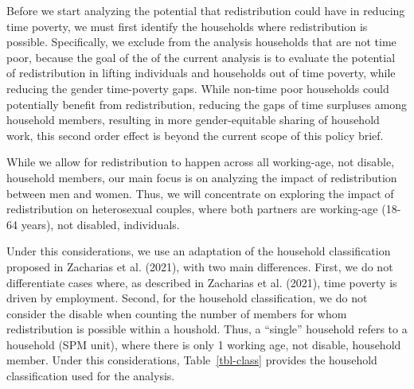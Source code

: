 \documentclass[
  11pt,
]{article}
\begin{document}
Before we start analyzing the potential that redistribution could have
in reducing time poverty, we must first identify the households where
redistribution is possible. Specifically, we exclude from the analysis
households that are not time poor, because the goal of the of the
current analysis is to evaluate the potential of redistribution in
lifting individuals and households out of time poverty, while reducing
the gender time-poverty gaps. While non-time poor households could
potentially benefit from redistribution, reducing the gaps of time
surpluses among household members, resulting in more gender-equitable
sharing of household work, this second order effect is beyond the
current scope of this policy brief.

While we allow for redistribution to happen across all working-age, not
disable, household members, our main focus is on analyzing the impact of
redistribution between men and women. Thus, we will concentrate on
exploring the impact of redistribution on heterosexual couples, where
both partners are working-age (18-64 years), not disabled, individuals.

Under this considerations, we use an adaptation of the household
classification proposed in Zacharias et al. (2021), with two main
differences. First, we do not differentiate cases where, as described in
Zacharias et al. (2021), time poverty is driven by employment. Second,
for the household classification, we do not consider the disable when
counting the number of members for whom redistribution is possible
within a houshold. Thus, a ``single'' household refers to a household
(SPM unit), where there is only 1 working age, not disable, household
member. Under this considerations, Table~\ref{tbl-class} provides the
household classification used for the analysis.
\end{document}
